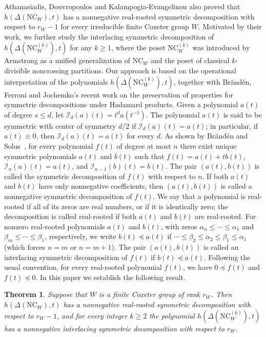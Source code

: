 \documentclass[12pt]{article}
\newtheorem{thm}{Theorem}[section]
\newcommand{\NC}{\mathrm{NC}}
\numberwithin{equation}{section}
\begin{document}
Athanasiadis, Douvropoulos and Kalampogia-Evangelinou \cite[Theorem 3 (b)]{Athanasiadis-Douvropoulos-Kalampogia-Evangelinou-2024} also proved that $h(\Delta(\NC_W),t)$ has a nonnegative real-rooted symmetric decomposition with respect to $r_W-1$ for every irreducible finite Coxeter group $W$.
Motivated by their work, we further study the interlacing symmetric decomposition of 
$h(\Delta(\NC^{(k)}_W),t)$ for any $k\geq 1$, 
where the poset $\NC^{(k)}_W$ was introduced by Armstrong \cite{Armstrong-2009}
as a unified generalization of $\NC_W$ and the poset of classical $k$-divisible noncrossing partitions.
Our approach is based on the operational interpretation of the polynomials $h(\Delta(\NC^{(k)}_W),t)$, together with Br\"and\'en, Ferroni and Jochemko's recent work \cite{Branden-2024} on the preservation of properties for symmetric decompositions under Hadamard products. 
Given a polynomial $a(t)$ of degree $s\leq d$, let $\mathcal{I}_d(a)(t)=t^d a(t^{-1})$. The polynomial $a(t)$ is said to be symmetric with center of symmetry $d/2$ if $\mathcal{I}_d(a)(t)=a(t)$; in particular, if $a(t)\equiv0$, then $\mathcal{I}_d(a)(t)=a(t)$ for every $d$. As shown by Br\"and\'en and Solus~\cite{Branden-2021}, for every polynomial $f(t)$ of degree at most $n$ there exist unique symmetric polynomials $a(t)$ and $b(t)$ such that $f(t)=a(t)+tb(t)$, $\mathcal{I}_n(a)(t)=a(t)$, and $\mathcal{I}_{n-1}(b)(t)=b(t)$. The pair $(a(t),b(t))$ is called the symmetric decomposition of $f(t)$ with respect to $n$. If both $a(t)$ and $b(t)$ have only nonnegative coefficients, then $(a(t),b(t))$ is called a nonnegative symmetric decomposition of $f(t)$. We say that a polynomial is real-rooted if all of its zeros are real numbers, or if it is identically zero; the decomposition is called real-rooted if both $a(t)$ and $b(t)$ are real-rooted. For nonzero real-rooted polynomials $a(t)$ and $b(t)$, with zeros $\alpha_n\leq\cdots\leq \alpha_1$ and $\beta_m\leq\cdots\leq \beta_1$, respectively, we write $b(t)\preceq a(t)$ if $\cdots\leq \beta_2\leq \alpha_2\leq \beta_1\leq \alpha_1$ (which forces $n=m$ or $n=m+1$). The pair $(a(t),b(t))$ is called an interlacing symmetric decomposition of $f(t)$ if $b(t)\preceq a(t)$. Following the usual convention, for every real-rooted polynomial $f(t)$, we have $0\preceq f(t)$ and $f(t)\preceq0$. 
In this paper we establish the following result. 

\begin{thm} \label{interlacing-sd}
Suppose that $W$ is a finite Coxeter group of rank $r_W$. Then $h(\Delta(\NC_W),t)$ has a nonnegative real-rooted symmetric decomposition with respect to $r_W-1$, and for every integer $k\geq 2$ the polynomial $h(\Delta(\NC^{(k)}_W),t)$ has a nonnegative interlacing symmetric decomposition with respect to $r_W$. 
\end{thm}
\end{document}
